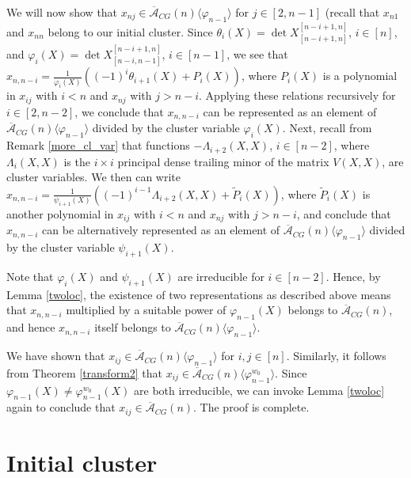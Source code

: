 \documentclass{amsart}
\theoremstyle{definition}
\theoremstyle{remark}
\numberwithin{equation}{section}
\numberwithin{theorem}{section}
\begin{document}
We will now show that $x_{nj}\in {\overline{{\mathcal A}}}_{CG}(n)\langle {{\varphi}}_{n-1}\rangle $ for $j\in [2,n-1]$ (recall that $x_{n1}$ and $x_{nn}$ belong to our initial cluster. Since $\theta_i(X) = \det X^{[n-i+1,n]}_{[n-i+1,n]}$, $i\in[n]$, 
and ${{\varphi}}_i(X)=  \det X^{[n-i+1,n]}_{[n-i,n-1]}$, $i\in[n-1]$, we see that $x_{n, n-i} = \frac {1}{{{\varphi}}_i(X)} \left ((-1)^{i} \theta_{i+1}(X) + P_i(X)\right )$, where
$P_i(X)$ is a polynomial in $x_{ij}$ with $i < n$ and $x_{nj}$ with $j > n -i$. Applying these relations recursively for $i\in [2, n-2]$, we conclude
that $x_{n, n-i}$ can be represented as an element of $ {\overline{{\mathcal A}}}_{CG}(n)\langle {{\varphi}}_{n-1}\rangle $ divided by the cluster variable ${{\varphi}}_i(X)$.
Next, recall from Remark \ref{more_cl_var} that functions $-\Lambda_{i+2}(X, X)$,  $i\in [n-2]$, where $\Lambda_{i}(X,X)$ is the $i\times i$ principal dense
trailing minor of the matrix $V(X,X)$, are cluster variables. We then can write $x_{n,n-i}=\frac {1}{{{\psi}}_{i+1}(X)} \left ((-1)^{i-1} \Lambda_{i+2}(X,X) + \tilde P_i(X)\right )$, where
$\tilde P_i(X)$ is another polynomial in $x_{ij}$ with $i < n$ and $x_{nj}$ with $j > n -i$, and conclude that $x_{n, n-i}$ can be alternatively represented as an element of $ {\overline{{\mathcal A}}}_{CG}(n)\langle {{\varphi}}_{n-1}\rangle $ divided by the cluster variable ${{\psi}}_{i+1}(X)$. 

Note that ${{\varphi}}_i(X)$ and ${{\psi}}_{i+1}(X)$ are irreducible for $i\in[n-2]$. Hence,
by Lemma \ref{twoloc}, the existence of two representations as described above means that $x_{n,n-i}$
multiplied by a suitable power of ${{\varphi}}_{n-1}(X)$ belongs to ${\overline{{\mathcal A}}}_{CG}(n)$, and hence $x_{n,n-i}$
itself belongs to ${\overline{{\mathcal A}}}_{CG}(n)\langle {{\varphi}}_{n-1}\rangle $. 

 We have shown that $x_{ij} \in {\overline{{\mathcal A}}}_{CG}(n)\langle {{\varphi}}_{n-1}\rangle $ for $i,j\in [n]$. 
 Similarly, it follows from Theorem \ref{transform2} that
  $x_{ij} \in {\overline{{\mathcal A}}}_{CG}(n)\langle {{\varphi}}^{w_0}_{n-1}\rangle $. Since ${{\varphi}}_{n-1}(X) \ne {{\varphi}}^{w_0}_{n-1}(X)$
  are both irreducible, we can invoke Lemma \ref{twoloc} again to conclude that  $x_{ij} \in {\overline{{\mathcal A}}}_{CG}(n) $.
The proof is complete.

\section{Initial cluster}
\end{document}
